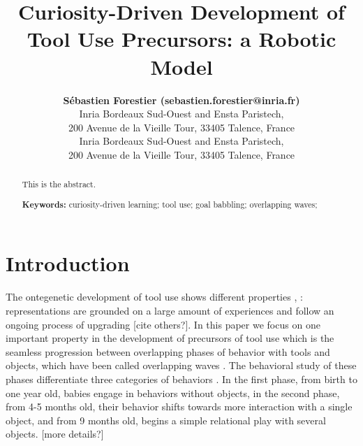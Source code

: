 \documentclass[10pt,letterpaper]{article}
\title{Curiosity-Driven Development of Tool Use Precursors: a Robotic Model}
\author{{\large \bf S\'ebastien Forestier (sebastien.forestier@inria.fr)} \\
	Inria Bordeaux Sud-Ouest and Ensta Paristech,\\
	200 Avenue de la Vieille Tour, 33405 Talence, France
  \AND {\large \bf Pierre-Yves Oudeyer (pierre-yves.oudeyer@inria.fr)} \\
	Inria Bordeaux Sud-Ouest and Ensta Paristech,\\
	200 Avenue de la Vieille Tour, 33405 Talence, France}
\begin{document}
\maketitle


\begin{abstract}
This is the abstract.

\textbf{Keywords:} 
curiosity-driven learning; tool use; goal babbling; overlapping waves; 
\end{abstract}


\section{Introduction}

	The ontegenetic development of tool use shows different properties \cite{guerin2013survey}, \cite{fenson1976developmental}: 
	representations are grounded on a large amount of experiences and follow an ongoing process of upgrading [cite others?].
	In this paper we focus on one important property in the development of precursors of tool use which is the seamless progression 
	between overlapping phases of behavior with tools and objects, which have been called overlapping waves \cite{siegler1996emerging}. 
	The behavioral study of these phases differentiate three categories of behaviors \cite{guerin2013survey}.
	In the first phase, from birth to one year old, babies engage in behaviors without objects, in the second phase, from 4-5 months old, their behavior shifts towards more interaction with a single object, and from 9 months old, begins a simple relational play with several objects.
	[more details?]
	
\end{document}
